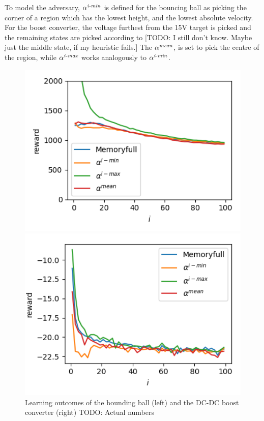 \documentclass{llncs}
\begin{document}
To model the adversary, $\alpha^{\emph{i-min}}$ is defined for the bouncing ball as picking the corner of a region 
which has the lowest height, and the lowest absolute velocity. 
For the boost converter, the voltage furthest from the 15V target is picked and the remaining states 
are picked according to [TODO: I still don't know. Maybe just the middle state, if my heuristic fails.]
The $\alpha^{\emph{mean}}$, is set to pick the centre of the region, while $\alpha^{\emph{i-max}}$ works analogously to $\alpha^{\emph{i-min}}$.

\begin{figure}
  \begin{minipage}{0.45\linewidth}
  \includegraphics[width=1\textwidth]{./Figures/BB.png}
  \end{minipage}
  \begin{minipage}{0.45\linewidth}
  \includegraphics[width=1\textwidth]{./Figures/DC.png}
  \end{minipage}
  \caption{Learning outcomes of the bounding ball (left) and the DC-DC boost converter (right) TODO: Actual numbers}
  \label{fig:casestudies}
\end{figure}
\end{document}
